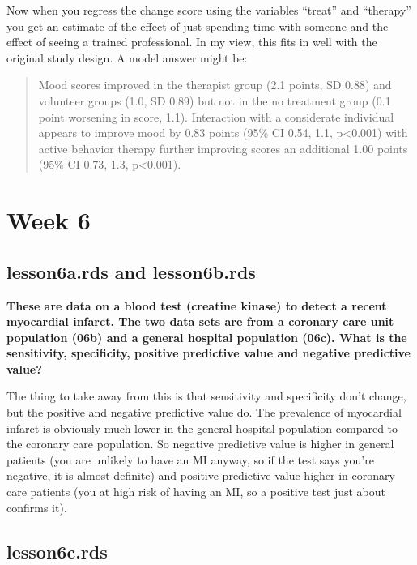 \documentclass[]{book}
\begin{document}
Now when you regress the change score using the variables ``treat'' and
``therapy'' you get an estimate of the effect of just spending time with
someone and the effect of seeing a trained professional. In my view,
this fits in well with the original study design. A model answer might
be:

\begin{quote}
Mood scores improved in the therapist group (2.1 points, SD 0.88) and
volunteer groups (1.0, SD 0.89) but not in the no treatment group (0.1
point worsening in score, 1.1). Interaction with a considerate
individual appears to improve mood by 0.83 points (95\% CI 0.54, 1.1,
p\textless0.001) with active behavior therapy further improving scores
an additional 1.00 points (95\% CI 0.73, 1.3, p\textless0.001).
\end{quote}

\hypertarget{week-6-1}{%
\section{Week 6}\label{week-6-1}}

\hypertarget{lesson6a.rds-and-lesson6b.rds}{%
\subsection{lesson6a.rds and
lesson6b.rds}\label{lesson6a.rds-and-lesson6b.rds}}

\textbf{These are data on a blood test (creatine kinase) to detect a
recent myocardial infarct. The two data sets are from a coronary care
unit population (06b) and a general hospital population (06c). What is
the sensitivity, specificity, positive predictive value and negative
predictive value?}

The thing to take away from this is that sensitivity and specificity
don't change, but the positive and negative predictive value do. The
prevalence of myocardial infarct is obviously much lower in the general
hospital population compared to the coronary care population. So
negative predictive value is higher in general patients (you are
unlikely to have an MI anyway, so if the test says you're negative, it
is almost definite) and positive predictive value higher in coronary
care patients (you at high risk of having an MI, so a positive test just
about confirms it).

\hypertarget{lesson6c.rds}{%
\subsection{lesson6c.rds}\label{lesson6c.rds}}
\end{document}
